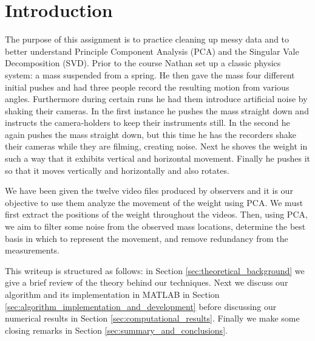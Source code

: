 \documentclass[fleqn,10pt]{../SelfArx} %
\affiliation{\textsuperscript{1}\textit{Department of Applied Mathematics, University of Washington, Seattle}} %
\begin{document}
\flushbottom %

\maketitle %

\tableofcontents %



\section{Introduction}
\label{sec:introduction}
The purpose of this assignment is to practice cleaning up messy data and to better understand Principle Component Analysis (PCA) and the Singular Vale Decomposition (SVD). Prior to the course Nathan set up a classic physics system: a mass suspended from a spring. He then gave the mass four different initial pushes and had three people record the resulting motion from various angles. Furthermore during certain runs he had them introduce artificial noise by shaking their cameras. In the first instance he pushes the mass straight down and instructs the camera-holders to keep their instruments still. In the second he again pushes the mass straight down, but this time he has the recorders shake their cameras while they are filming, creating noise. Next he shoves the weight in such a way that it exhibits vertical and horizontal movement. Finally he pushes it so that it moves vertically and horizontally and also rotates.

We have been given the twelve video files produced by observers and it is our objective to use them analyze the movement of the weight using PCA. We must first extract the positions of the weight throughout the videos. Then, using PCA, we aim to filter some noise from the observed mass locations, determine the best basis in which to represent the movement, and remove redundancy from the measurements.

This writeup is structured as follows: in Section \ref{sec:theoretical_background} we give a brief review of the theory behind our techniques. Next we discuss our algorithm and its implementation in MATLAB in Section \ref{sec:algorithm_implementation_and_development} before discussing our numerical results in Section \ref{sec:computational_results}. Finally we make some closing remarks in Section \ref{sec:summary_and_conclusions}.
\end{document}
